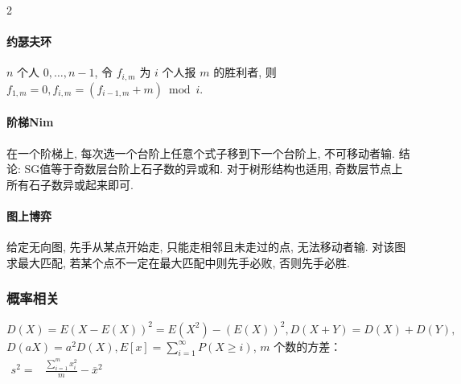 \begin{multicols}{2}
\paragraph{约瑟夫环}$n$ 个人 $0,\dots,n-1$, 令 $f_{i,m}$ 为 $i$ 个人报 $m$ 的胜利者, 则 $f_{1,m}=0,f_{i,m}=(f_{i-1,m}+m)\bmod i$.
\paragraph{阶梯Nim} 在一个阶梯上, 每次选一个台阶上任意个式子移到下一个台阶上, 不可移动者输. 结论: SG值等于奇数层台阶上石子数的异或和. 对于树形结构也适用, 奇数层节点上所有石子数异或起来即可.
\paragraph{图上博弈} 给定无向图, 先手从某点开始走, 只能走相邻且未走过的点, 无法移动者输. 对该图求最大匹配, 若某个点不一定在最大匹配中则先手必败, 否则先手必胜.
\end{multicols}

\subsubsection{概率相关}
$D(X)=E(X-E(X))^2=E(X^2)-(E(X))^2,D(X+Y)=D(X)+D(Y),$\\
$D(aX)=a^2D(X), E[x]=\sum_{i=1}^{\infty}P(X\geq i)$, $m$ 个数的方差：$\begin{aligned}s^2=&\frac{\sum_{i=1}^m x_i^2}m-\overline x^2\end{aligned}$
